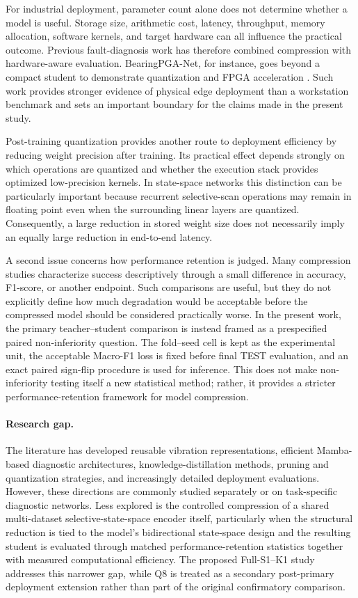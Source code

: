For industrial deployment, parameter count alone does not determine whether a model is useful. Storage size, arithmetic cost, latency, throughput, memory allocation, software kernels, and target hardware can all influence the practical outcome. Previous fault-diagnosis work has therefore combined compression with hardware-aware evaluation. BearingPGA-Net, for instance, goes beyond a compact student to demonstrate quantization and FPGA acceleration \citep{Liao2024BearingPGANet}. Such work provides stronger evidence of physical edge deployment than a workstation benchmark and sets an important boundary for the claims made in the present study.

Post-training quantization provides another route to deployment efficiency by reducing weight precision after training. Its practical effect depends strongly on which operations are quantized and whether the execution stack provides optimized low-precision kernels. In state-space networks this distinction can be particularly important because recurrent selective-scan operations may remain in floating point even when the surrounding linear layers are quantized. Consequently, a large reduction in stored weight size does not necessarily imply an equally large reduction in end-to-end latency.

A second issue concerns how performance retention is judged. Many compression studies characterize success descriptively through a small difference in accuracy, F1-score, or another endpoint. Such comparisons are useful, but they do not explicitly define how much degradation would be acceptable before the compressed model should be considered practically worse. In the present work, the primary teacher--student comparison is instead framed as a prespecified paired non-inferiority question. The fold--seed cell is kept as the experimental unit, the acceptable Macro-F1 loss is fixed before final TEST evaluation, and an exact paired sign-flip procedure is used for inference. This does not make non-inferiority testing itself a new statistical method; rather, it provides a stricter performance-retention framework for model compression.

\paragraph{Research gap.}
The literature has developed reusable vibration representations, efficient Mamba-based diagnostic architectures, knowledge-distillation methods, pruning and quantization strategies, and increasingly detailed deployment evaluations. However, these directions are commonly studied separately or on task-specific diagnostic networks. Less explored is the controlled compression of a shared multi-dataset selective-state-space encoder itself, particularly when the structural reduction is tied to the model's bidirectional state-space design and the resulting student is evaluated through matched performance-retention statistics together with measured computational efficiency. The proposed Full-S1--K1 study addresses this narrower gap, while Q8 is treated as a secondary post-primary deployment extension rather than part of the original confirmatory comparison.
